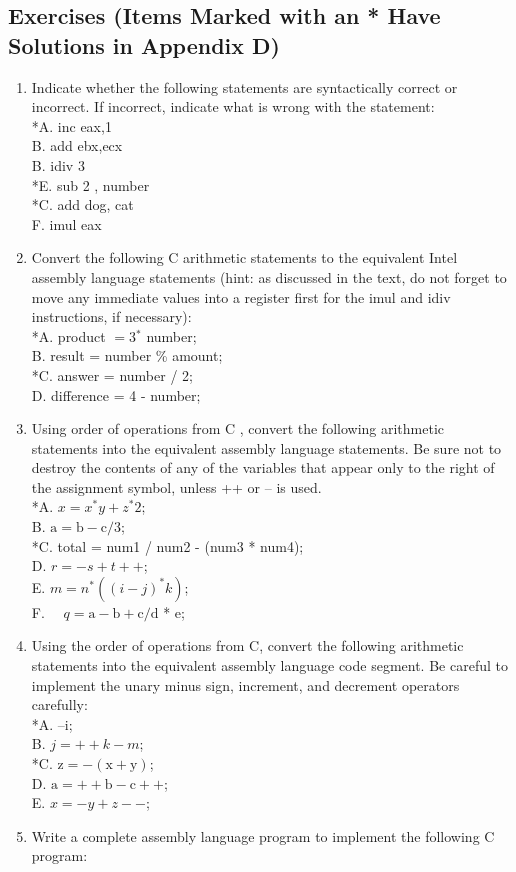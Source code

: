 \documentclass[10pt]{article}
\begin{document}
\subsection*{Exercises (Items Marked with an * Have Solutions in Appendix D)}
\begin{enumerate}
  \item Indicate whether the following statements are syntactically correct or incorrect. If incorrect, indicate what is wrong with the statement:\\
*A. inc eax,1\\
B. add ebx,ecx\\
B. idiv 3\\
*E. sub 2 , number\\
*C. add dog, cat\\
F. imul eax
  \item Convert the following C arithmetic statements to the equivalent Intel assembly language statements (hint: as discussed in the text, do not forget to move any immediate values into a register first for the imul and idiv instructions, if necessary):\\
*A. product $=3{ }^{*}$ number;\\
B. result = number \% amount;\\
*C. answer = number / 2;\\
D. difference = 4 - number;
  \item Using order of operations from C , convert the following arithmetic statements into the equivalent assembly language statements. Be sure not to destroy the contents of any of the variables that appear only to the right of the assignment symbol, unless ++ or -- is used.\\
*A. $x=x{ }^{*} y+z{ }^{*} 2$;\\
B. $\mathrm{a}=\mathrm{b}-\mathrm{c} / 3$;\\
*C. total = num1 / num2 - (num3 * num4);\\
D. $r=-s+t++$;\\
E. $m=n^{*}\left((i-j)^{*} k\right)$;\\
F. $\quad q=\mathrm{a}-\mathrm{b}+\mathrm{c} / \mathrm{d}$ * e;
  \item Using the order of operations from C, convert the following arithmetic statements into the equivalent assembly language code segment. Be careful to implement the unary minus sign, increment, and decrement operators carefully:\\
*A. --i;\\
B. $j=++k-m$;\\
*C. $\mathrm{z}=-(\mathrm{x}+\mathrm{y})$;\\
D. $\mathrm{a}=++\mathrm{b}-\mathrm{c}++$;\\
E. $x=-y+z--$;
  \item Write a complete assembly language program to implement the following C program:
\end{enumerate}
\end{document}
